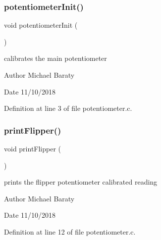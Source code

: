 \subsubsection{potentiometer\+Init()}
{\footnotesize\ttfamily void potentiometer\+Init (\begin{DoxyParamCaption}{ }\end{DoxyParamCaption})}



calibrates the main potentiometer 

\begin{DoxyAuthor}{Author}
Michael Baraty 
\end{DoxyAuthor}
\begin{DoxyDate}{Date}
11/10/2018 
\end{DoxyDate}


Definition at line 3 of file potentiometer.\+c.

\mbox{\label{potentiometer_8h_adaa13aa8239ccc6d7f3aa37bb4089e41}} 
\subsubsection{print\+Flipper()}
{\footnotesize\ttfamily void print\+Flipper (\begin{DoxyParamCaption}{ }\end{DoxyParamCaption})}



prints the flipper potentiometer calibrated reading 

\begin{DoxyAuthor}{Author}
Michael Baraty 
\end{DoxyAuthor}
\begin{DoxyDate}{Date}
11/10/2018 
\end{DoxyDate}


Definition at line 12 of file potentiometer.\+c.

